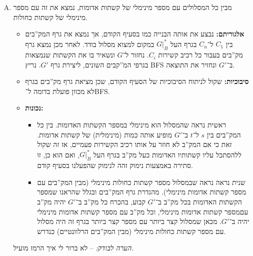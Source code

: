 \documentclass[]{../../../../tex/classes/homework}
\begin{document}
\begin{enumerate}[A.]
		\item מבין כל המסלולים עם מספר מינימלי של קשתות אדומות, נמצא את זה עם מספר מינימלי של קשתות כחולות. 
		\begin{itemize}
			\item \textbf{אלגוריתם: }נבצע את אותה הבנייה כמו בסעיף הקודם, אך נמצא את גרף המק''בים בין $C_1$ ל־$C_n$ בגרף העל $G|_B^*$ במקום למצוא מסלול בודד. לאחר מכן נמצא גרף מק''בים בעבור כל רכיב קשירות $C_i$. נחזור ל־$G$ ונשאיר בו את הקשתות שנמצאות בגרפי המ''קבים השונים, ליצירת גרף $G'$. נריץ BFS ב־$G'$ ונחזיר את התוצאה. 
			
			\item \textbf{סיבוכיות: }שקול לניתוח הסיבוכיות של הסעיף הקודם, שכן מציאת גרף מק''בים בגרף לא מכוון פועלת בדומה ל־BFS. 
			\item \textbf{נכונות: }
			\begin{itemize}
				\item ראשית נראה שהמסלול הוא מינימלי במספר הקשתות האדומות. בין כל המק''בים בין $s$ ל־$t$ ב־$G'$ מופיע אותה כמות (מינימלית) של קשתות אדומות. זאת כי אם המק''ב לא חוזר על אותו רכיב הקשירות פעמיים, אז זה שקול ללהסתכל עליו קשתותיו האדומות כעל מק''ב בגרף העל $G|_B^*$, ואם הוא כן, זו סתירה באמצעות נימוק זהה לנימוק שהפעלנו בסעיף קודם. 
				\item שנית נראה נראה שבמסלול מספר קשתות כחולות מינימלי (מבין המק''בים עם מספר קשתות אדומות מינימלי). מהגדרת גרף המק''בים ובגלל שהראנו שמספר הקשתות האדומות בכל מק''ב ב־$G'$ קבוע, בהכרח כל מק''ב ב־$G'$ יהיה מק''ב עםמספר קשתות אדומות מינימלי, וכל מק''ב עם מספר קשתות אדומות מינימלי יהיה ב־$G'$. מכאן שמסלול קצר ביותר עם מספר קצר ביותר בגרף זה היה מסלול עם מספר קשתות כחולות מינימלי (מבין המק''בים הרלוונטיים) כנדרש. 
			\end{itemize}
		\end{itemize}
		
		\textit{הערה לבודק: }– לא ברור לי איך הרמז מועיל. 
	\end{enumerate}
	
	
	\ndoc
\end{document}
